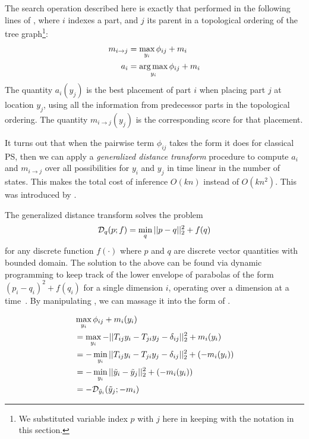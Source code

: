 The search operation described here is exactly that performed in the following 
lines of , where $i$ indexes a part, and $j$ its parent 
in a topological ordering of the tree graph\footnote{We substituted variable 
index $p$ with $j$ here in keeping with the notation in this section.}:
\begin{align}
\label{eq:pairwise-max}
m_{i \rightarrow j} &= \max_{y_i} \phi_{ij} + m_i\\
a_i &= \mathop{\arg\max}_{y_i} \phi_{ij} + m_i
\end{align}
The quantity $a_i(y_j)$ is the best placement of part $i$ when placing part $j$ 
at location $y_j$, using all the information from predecessor parts in the 
topological ordering.  The quantity $m_{i \rightarrow j}(y_j)$ is the 
corresponding score for that placement.  

It turns out that when the pairwise term $\phi_{ij} $ takes the form it does 
for classical PS, then we can apply a {\em generalized distance transform} 
procedure to compute $a_i$ and $m_{i \rightarrow j}$ over all possibilities for 
$y_i$ and $y_j$ in time linear in the number of states. This makes the total 
cost of inference $O(kn)$ instead of $O(kn^2)$. This was introduced by 
\citet{felz05}.

The generalized distance transform solves the problem
\begin{align}
\label{eq:dt-prob}
\mathcal{D}_q(p; f) = \min_q ||p-q||_2^2 + f(q)
\end{align}
for any discrete function $f(\cdot)$ where $p$ and $q$ are discrete vector 
quantities with bounded domain.  The solution to the above can be found via 
dynamic programming to keep track of the lower envelope of parabolas of the 
form $(p_i-q_i)^2 + f(q_i)$ for a single dimension $i$, operating over a 
dimension at a time~\citep{felz-dt}.  By manipulating , we 
can massage it into the form of .

\begin{align}
&\max_{y_i} \phi_{ij} + m_i(y_i)\\
&= \max_{y_i} -||T_{ij}y_i - T_{ji}y_j - \delta_{ij}||_2^2 + m_i(y_i) \\
&= -\min_{y_i} ||T_{ij}y_i - T_{ji}y_j - \delta_{ij}||_2^2 + (-m_i(y_i)) \\
&= -\min_{y_i} ||\tilde{y}_i - \tilde{y}_j||_2^2 + (-m_i(y_i)) \\
&= -\mathcal{D}_{\tilde{y}_i}(\tilde{y}_j; -m_i)
\end{align}


